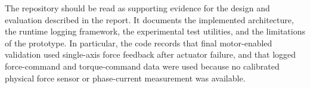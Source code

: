 \begin{uomappendix}
	The repository should be read as supporting evidence for the design and evaluation described in the report. It documents the implemented architecture, the runtime logging framework, the experimental test utilities, and the limitations of the prototype. In particular, the code records that final motor-enabled validation used single-axis force feedback after actuator failure, and that logged force-command and torque-command data were used because no calibrated physical force sensor or phase-current measurement was available.
\end{uomappendix}



